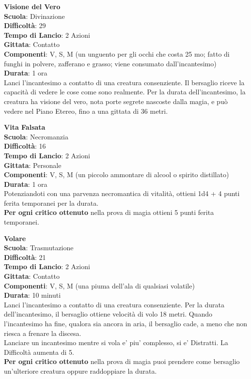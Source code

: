 \begin{multicols}{2}
\medskip\textbf{Visione del Vero}\\
\textbf{Scuola}: Divinazione\\
\textbf{Difficoltà}: 29\\
\textbf{Tempo di Lancio}: 2 Azioni\\
\textbf{Gittata}: Contatto\\
\textbf{Componenti}: V, S, M (un unguento per gli occhi che costa 25 mo; fatto di funghi in polvere, zafferano e grasso; viene consumato dall'incantesimo)\\
\textbf{Durata}: 1 ora\\
Lanci l'incantesimo a contatto di una creatura consenziente. Il bersaglio riceve la capacità di vedere le cose come sono realmente. Per la durata dell'incantesimo, la creatura ha visione del vero, nota porte segrete nascoste dalla magia, e può vedere nel Piano Etereo, fino a una gittata di 36 metri.

\medskip\textbf{Vita Falsata}\\
\textbf{Scuola}: Necromanzia\\
\textbf{Difficoltà}: 16\\
\textbf{Tempo di Lancio}: 2 Azioni\\
\textbf{Gittata}: Personale\\
\textbf{Componenti}: V, S, M (un piccolo ammontare di alcool o spirito distillato)\\
\textbf{Durata}: 1 ora\\
Potenziandoti con una parvenza necromantica di vitalità, ottieni 1d4 + 4 punti ferita temporanei per la durata.\\
\textbf{Per ogni critico ottenuto} nella prova di magia ottieni 5 punti ferita temporanei.

\medskip\textbf{Volare}\\
\textbf{Scuola}: Trasmutazione\\
\textbf{Difficoltà}: 21\\
\textbf{Tempo di Lancio}: 2 Azioni\\
\textbf{Gittata}: Contatto\\
\textbf{Componenti}: V, S, M (una piuma dell'ala di qualsiasi volatile)\\
\textbf{Durata}: 10 minuti \\
Lanci l'incantesimo a contatto di una creatura consenziente. Per la durata dell'incantesimo, il bersaglio ottiene velocità di volo 18 metri. Quando l'incantesimo ha fine, qualora sia ancora in aria, il bersaglio cade, a meno che non riesca a frenare la discesa.\\
Lanciare un incantesimo mentre si vola e' piu' complesso, si e' Distratti. La Difficoltà aumenta di 5.\\
\textbf{Per ogni critico ottenuto} nella prova di magia puoi prendere come bersaglio un'ulteriore creatura oppure raddoppiare la durata.


\end{multicols}
